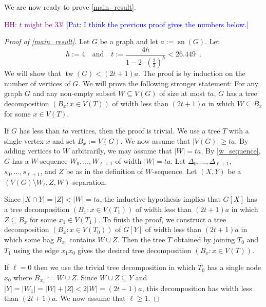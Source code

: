 \documentclass{patmorin}
\newcommand{\pat}[1]{\textcolor{Blue}{[Pat: #1]}}
\DeclareMathOperator{\sep}{sn}
\DeclareMathOperator{\tw}{tw}
\newcommand{\hussein}[1]{\textcolor{purple}{HH: #1}}
\begin{document}
We are now ready to prove \cref{main_result}.

\hussein{$t$ might be $33$!}  \pat{I think the previous proof gives the numbers below.}

\begin{proof}[Proof of \cref{main_result}]
  Let $G$ be a graph and let $a:=\sep(G)$.  Let
  \[
    h:=4 \quad\text{and}\quad t:=\frac{4h}{1-2\cdot(\tfrac{2}{3})^{h}} < 26.449 \enspace .
  \]
  We will show that $\tw(G)< (2t+1)a$. The proof is by induction on the number of vertices of $G$. We will prove the following stronger statement: For any graph $G$ and any non-empty subset $W\subseteq V(G)$ of size at most $ta$, $G$ has a tree decomposition $(B_x:x\in V(T))$ of width less than $(2t+1)a$ in which $W\subseteq B_x$ for some $x\in V(T)$.

  If $G$ has less than $ta$ vertices, then the proof is trivial. We use a tree $T$ with a single vertex $x$ and set $B_x:=V(G)$.  We now assume that $|V(G)|\ge ta$. By adding vertices to $W$ arbitrarily, we may assume that $|W|=ta$. By \cref{w_sequence}, $G$ has a $W$-sequence $W_0,\ldots,W_{\ell+1}$ of width $|W|=ta$.   Let $\Delta_0,\ldots,\Delta_{\ell+1}$, $s_0,\ldots,s_{\ell+1}$, and $Z$ be as in the definition of $W$-sequence.  Let $(X,Y)$ be a $(V(G)\setminus W_{\ell},Z,W)$-separation.

  Since $|X\cap Y|=|Z|<|W|=ta$, the inductive hypothesis implies that $G[X]$ has a tree decomposition $(B_x:x\in V(T_1))$ of width less than $(2t+1)a$ in which $Z\subseteq B_x$ for some $x_1\in V(T_1)$.  To finish the proof, we construct a tree decomposition $(B_x:x\in V(T_0))$ of $G[Y]$ of width less than $(2t+1)a$ in which some bag $B_{x_0}$ contains $W\cup Z$.  Then the tree $T$ obtained by joining $T_0$ and $T_1$ using the edge $x_1x_0$ gives the desired tree decomposition $(B_x:x\in V(T))$.

  If $\ell=0$ then we use the trivial tree decomposition in which $T_0$ has a single node $x_0$ where $B_{x_0}:=W\cup Z$.  Since $W\cup Z\subseteq Y$ and $|Y|=|W_1|=|W|+|Z|< 2|W|=(2t+1)a$, this decomposition has width less than $(2t+1)a$. We now assume that $\ell\ge  1$.




\end{proof}
\end{document}
